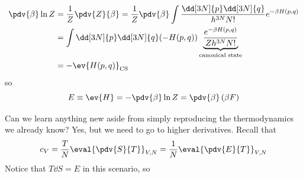 \documentclass[a4paper,twoside,master.tex]{subfiles}
\begin{document}

\begin{align}
    \pdv{\beta} \ln{Z} &= \frac{1}{Z} \pdv{Z}{\beta} = \frac{1}{Z} \pdv{\beta} \int \frac{\dd[3N]{p} \dd[3N]{q}}{h^{3N} N!} e^{- \beta H(p,q)} \\
    &= \int \dd[3N]{p} \dd[3N]{q} (- H(p,q)) \underbrace{\frac{e^{- \beta H(p,q)}}{Z h^{3N} N!}}_{\text{canonical state}} \\
    &= - \ev{H(p,q)}_{\text{CS}}
\end{align}
so
\begin{equation}
    E \equiv \ev{H} = - \pdv{\beta}\ln Z = \pdv{\beta} \left( \beta F \right)
\end{equation}

Can we learn anything new aside from simply reproducing the thermodynamics we already know? Yes, but we need to go to higher derivatives. Recall that
\begin{equation}
    c_V = \frac{T}{N} \eval{\pdv{S}{T}}_{V,N} = \frac{1}{N} \eval{\pdv{E}{T}}_{V,N}
\end{equation}
Notice that $ T \dd{S} = E $ in this scenario, so
\end{document}
